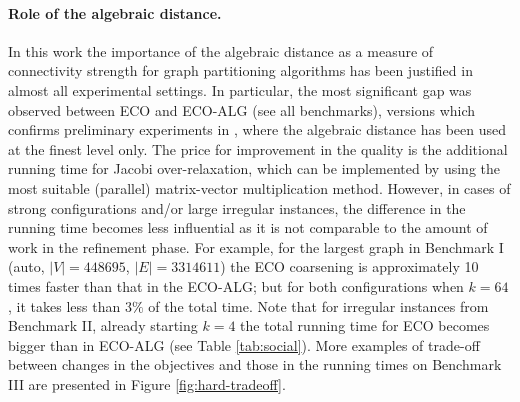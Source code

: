 \documentclass{llncs}
\begin{document}
\paragraph{Role of the algebraic distance.} In this work the importance of the algebraic distance as a measure of connectivity strength for graph partitioning algorithms has been justified in almost all experimental settings. In particular, the most significant gap was observed between ECO and ECO-ALG (see all benchmarks), versions which confirms preliminary experiments in \cite{chen-safro-algdist-full}, where the algebraic distance has been used at the finest level only. The price for improvement in the quality is the additional running time for Jacobi over-relaxation, which can be implemented by using the most suitable (parallel) matrix-vector multiplication method. However, in cases of  strong configurations and/or large irregular instances, the difference in the running time becomes less influential as it is not comparable to the amount of work in the refinement phase. 
For example, for the largest graph in Benchmark I (auto, $|V|=448695$, $|E|=3314611$) the ECO coarsening is approximately 10 times faster than that in the ECO-ALG; but for both configurations when $k=64$, it takes less than $3\%$ of the total time.
Note that for irregular instances from Benchmark II, already starting $k=4$ the total running time for ECO becomes bigger than in ECO-ALG (see Table \ref{tab:social}).
More examples of trade-off between changes in the objectives and those in the running times on Benchmark III are presented in Figure \ref{fig:hard-tradeoff}.
\end{document}
